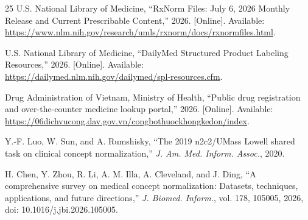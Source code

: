 \documentclass[11pt]{article}
\begin{document}
\begin{thebibliography}{25}
U.S. National Library of Medicine, ``RxNorm Files: July 6, 2026 Monthly Release and Current Prescribable Content,'' 2026. [Online]. Available: \url{https://www.nlm.nih.gov/research/umls/rxnorm/docs/rxnormfiles.html}.

U.S. National Library of Medicine, ``DailyMed Structured Product Labeling Resources,'' 2026. [Online]. Available: \url{https://dailymed.nlm.nih.gov/dailymed/spl-resources.cfm}.

Drug Administration of Vietnam, Ministry of Health, ``Public drug registration and over-the-counter medicine lookup portal,'' 2026. [Online]. Available: \url{https://06dichvucong.dav.gov.vn/congbothuockhongkedon/index}.

Y.-F. Luo, W. Sun, and A. Rumshisky, ``The 2019 n2c2/UMass Lowell shared task on clinical concept normalization,'' \emph{J. Am. Med. Inform. Assoc.}, 2020.

H. Chen, Y. Zhou, R. Li, A. M. Illa, A. Cleveland, and J. Ding, ``A comprehensive survey on medical concept normalization: Datasets, techniques, applications, and future directions,'' \emph{J. Biomed. Inform.}, vol. 178, 105005, 2026, doi: 10.1016/j.jbi.2026.105005.

\end{thebibliography}
\end{document}
